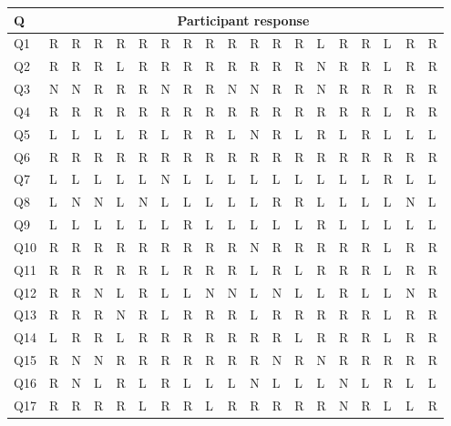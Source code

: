 \documentclass[]{article}
\begin{document}
\begin{table}[htb]
\centering
\begin{tabular}{|l|l|l|l|l|l|l|l|l|l|l|l|l|l|l|l|l|l|l|}
\hline
Q & \multicolumn{18}{c}{Participant response} \\ \hline
Q1  & R  & R  & R  & R  & R  & R  & R & R  & R  & R  & R  & R & L  & R  & R & L & R  & R \\ \hline
Q2  & R  & R  & R  & L  & R  & R  & R & R  & R  & R  & R  & R & N & R  & R & L & R  & R \\ \hline
Q3  & N & N & R  & R  & R  & N & R & R  & N & N & R  & R & N & R  & R & R & R  & R \\ \hline
Q4  & R  & R  & R  & R  & R  & R  & R & R  & R  & R  & R  & R & R  & R  & R & L & R  & R \\ \hline
Q5  & L  & L  & L  & L  & R  & L  & R & R  & L  & N & R  & L & R  & L  & R & L & L  & L \\ \hline
Q6  & R  & R  & R  & R  & R  & R  & R & R  & R  & R  & R  & R & R  & R  & R & R & R  & R \\ \hline
Q7  & L  & L  & L  & L  & L  & N & L & L  & L  & L  & L  & L & L  & L  & L & R & L  & L \\ \hline
Q8  & L  & N & N & L  & N & L  & L & L  & L  & L  & R  & R & L  & L  & L & L & N & L \\ \hline
Q9  & L  & L  & L  & L  & L  & L  & R & L  & L  & L  & L  & L & R  & L  & L & L & L  & L \\ \hline
Q10 & R  & R  & R  & R  & R  & R  & R & R  & R  & N & R  & R & R  & R  & R & L & R  & R \\ \hline
Q11 & R  & R  & R  & R  & R  & L  & R & R  & R  & L  & R  & L & R  & R  & R & L & R  & R \\ \hline
Q12 & R  & R  & N & L  & R  & L  & L & N & N & L  & N & L & L  & R  & L & L & N & R \\ \hline
Q13 & R  & R  & R  & N & R  & L  & R & R  & R  & L  & R  & R & R  & R  & R & L & R  & R \\ \hline
Q14 & L  & R  & R  & L  & R  & R  & R & R  & R  & R  & R  & L & R  & R  & R & L & R  & R \\ \hline
Q15 & R  & N & N & R  & R  & R  & R & R  & R  & R  & N & R & N & R  & R & R & R  & R \\ \hline
Q16 & R  & N & L  & R  & L  & R  & L & L  & L  & N & L  & L & L  & N & L & R & L  & L \\ \hline
Q17 & R  & R  & R  & R  & L  & R  & R & L  & R  & R  & R  & R & R  & N & R & L & L  & R \\ \hline

\end{tabular}
\end{table}
\end{document}
